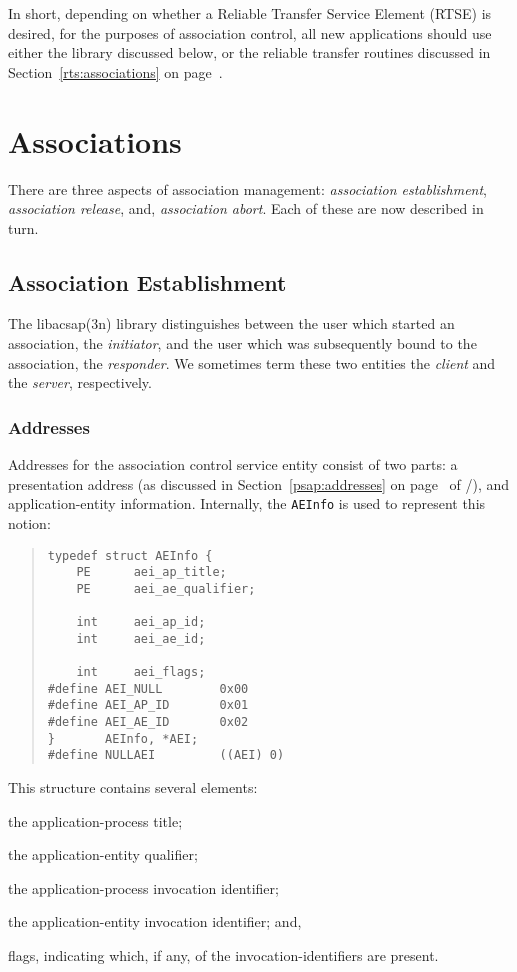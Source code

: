 In short, depending on whether a Reliable Transfer Service Element (RTSE) is
desired,
for the purposes of association control,
all new applications should use either the library discussed below,
or the reliable transfer routines discussed in
Section~\ref{rts:associations} on page~\pageref{rts:associations}.

\section	{Associations}\label{acs:associations}
There are three aspects of association management:
{\em association establishment},
{\em association release},
and,
{\em association abort}.
Each of these are now described in turn.

\subsection	{Association Establishment}
The \man libacsap(3n) library distinguishes between the user which started an
association,
the {\em initiator},
and the user which was subsequently bound to the association,
the {\em responder}.
We sometimes term these two entities the {\em client\/} and the {\em server},
respectively.

\subsubsection	{Addresses}\label{acs:addresses}\label{acs:aei}
Addresses for the association control service entity consist of two parts:
a presentation address (as discussed in Section~\ref{psap:addresses} on
page~\pageref{psap:addresses} of \voltwo/),
and application-entity information.
Internally,
the \verb"AEInfo" is used to represent this notion:
\begin{quote}\small\begin{verbatim}
typedef struct AEInfo {
    PE      aei_ap_title;
    PE      aei_ae_qualifier;

    int     aei_ap_id;
    int     aei_ae_id;

    int     aei_flags;
#define AEI_NULL        0x00
#define AEI_AP_ID       0x01
#define AEI_AE_ID       0x02
}       AEInfo, *AEI;
#define NULLAEI         ((AEI) 0)
\end{verbatim}\end{quote}
This structure contains several elements:
\begin{describe}
\item[\verb"aei\_ap\_title":] the application-process title;

\item[\verb"aei\_ae\_qualifier":] the application-entity qualifier;

\item[\verb"aei\_ap\_id":] the application-process invocation identifier;

\item[\verb"aei\_ae\_id":] the application-entity invocation identifier;
and,

\item[\verb"aei\_flags":] flags, indicating which, if any,
of the invocation-identifiers are present.
\end{describe}

